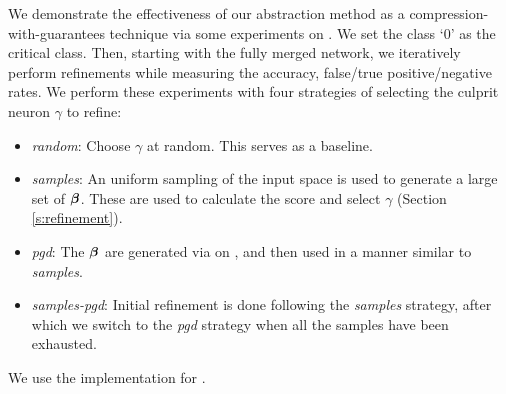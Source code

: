 We demonstrate the effectiveness of our abstraction method as a
compression-with-guarantees technique via some experiments on \mnist. We set the
class `0'
as the critical class. Then, starting with the fully merged network, we
iteratively perform refinements while measuring the accuracy, false/true
positive/negative rates. We perform these experiments with four strategies of
selecting the culprit neuron $\gamma$ to refine:

\begin{itemize}
    \item \textit{random}: Choose $\gamma$ at random. This serves as a
        baseline.
    \item \textit{samples}: An uniform sampling of the input space is used to
        generate a large set of \gencex $\boldsymbol{\beta}$. These are used to
        calculate the score and select $\gamma$ (Section 
        \ref{s:refinement}).
    \item \textit{pgd}: The $\boldsymbol{\beta}$ are generated via \pgd on \abs, and
        then used in a manner similar to \textit{samples}.
    \item \textit{samples-pgd}: Initial refinement is done following the
        \textit{samples} strategy, after which we switch to the \textit{pgd}
        strategy when all the samples have been exhausted.
\end{itemize}

We use the \abcrown implementation for \pgd.

